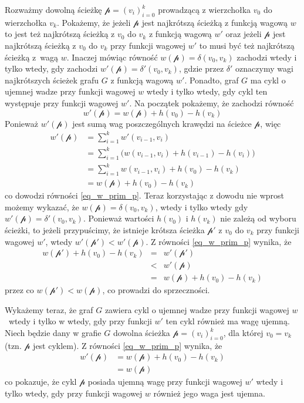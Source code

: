 \documentclass[12pt,a4paper]{book}
\theoremstyle{definition}
\newcommand{\p}{{\mathcal p}}
\numberwithin{equation}{chapter}
\begin{document}
Rozważmy dowolną ścieżkę  $\p = (v_i)_{i=0}^{k}$ prowadzącą z wierzchołka $v_0$ do wierzchołka $v_k$. Pokażemy, że jeżeli $\p$ jest najkrótszą ścieżką z funkcją wagową $w$ to jest też najkrótszą ścieżką z $v_0$ do  $v_k$ z funkcją wagową $w'$ oraz jeżeli $\p$ jest najkrótszą ścieżką z $v_0$ do $v_k$ przy funkcji wagowej $w'$ to musi być też najkrótszą ścieżką z~wagą $w$. Inaczej mówiąc równość $w(\p) = \delta(v_0, v_k)$ zachodzi wtedy i tylko wtedy, gdy zachodzi $w'(\p) = \delta'(v_0, v_k)$, gdzie przez $\delta'$ oznaczymy wagi najkrótszych ścieżek grafu $G$ z funkcją wagową $w'$. Ponadto, graf $G$ ma cykl o ujemnej wadze przy funkcji wagowej $w$ wtedy i tylko wtedy, gdy cykl ten występuje przy funkcji wagowej $w'$.
Na początek pokażemy, że zachodzi równość
\begin{equation}
\label{eq_w_prim_p}
	w'(\p) = w(\p)+h(v_0)-h(v_k)
\end{equation}
Ponieważ $w'(\p)$ jest sumą wag poszczególnych krawędzi na ścieżce $\p$, więc
$$
\begin{array}{ll}
w'(\p) & = \displaystyle\sum_{i=1}^{k} w'(v_{i-1}, v_i)\\
& = \displaystyle\sum_{i=1}^{k} \big(w(v_{i-1}, v_i) + h(v_{i-1}) - h(v_i)\big)\\
& = \displaystyle\sum_{i=1}^{k} w(v_{i-1}, v_i) + h(v_0) - h(v_k)\\
& = w(\p) + h(v_0) - h(v_k)
\end{array}
$$
co dowodzi równości \eqref{eq_w_prim_p}. Teraz korzystając z dowodu nie wprost możemy wykazać, że  $w(\p)=\delta(v_0, v_k)$, wtedy i tylko wtedy gdy $w'(\p)=\delta'(v_0, v_k)$. Ponieważ wartości $h(v_0)$ i $h(v_k)$ nie zależą od wyboru ścieżki, to jeżeli przypuścimy, że istnieje krótsza ścieżka $\p'$ z $v_0$ do $v_k$ przy funkcji wagowej $w'$, wtedy $w'(\p') < w'(\p)$. Z równości \eqref{eq_w_prim_p} wynika, że
$$
\begin{array}{lcl}
w(\p') + h(v_0) - h(v_k) & = & w'(\p') \\
& < & w'(\p) \\
& = & w(\p) + h(v_0) - h(v_k)
\end{array}
$$
przez co $w(\p') < w(\p)$, co prowadzi do sprzeczności. 

Wykażemy teraz, że graf $G$ zawiera cykl o ujemnej wadze przy funkcji wagowej $w$~wtedy i tylko w wtedy, gdy przy funkcji $w'$ ten cykl również ma wagę ujemną. Niech będzie dany w grafie $G$ dowolna ścieżka $\p = (v_i)_{i=0}^{k}$, dla której $v_0 = v_k$ (tzn. $\p$ jest cyklem). Z równości \eqref{eq_w_prim_p} wynika, że
$$
\begin{array}{ll}
w'(\p) & = w(\p) + h(v_0) - h(v_k)\\
& = w(\p)
\end{array}
$$
co pokazuje, że cykl $\p$ posiada ujemną wagę przy funkcji wagowej $w'$ wtedy i tylko wtedy, gdy przy funkcji wagowej $w$ również jego waga jest ujemna.
\end{document}
